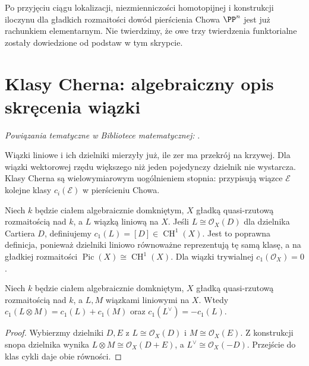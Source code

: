 \begin{uwaga}
Po przyjęciu ciągu lokalizacji, niezmienniczości
homotopijnej i konstrukcji iloczynu dla gładkich
rozmaitości dowód pierścienia Chowa $\PP^n$ jest
już rachunkiem elementarnym. Nie twierdzimy, że
owe trzy twierdzenia funktorialne zostały dowiedzione
od podstaw w tym skrypcie.
\end{uwaga}

\section{Klasy Cherna: algebraiczny opis skręcenia wiązki}
\label{sec:ga7-chern}

\noindent\emph{Powiązania tematyczne w Bibliotece matematycznej:} .


Wiązki liniowe i ich dzielniki mierzyły już, ile zer
ma przekrój na krzywej. Dla wiązki wektorowej rzędu
większego niż jeden pojedynczy dzielnik nie wystarcza.
Klasy Cherna są wielowymiarowym uogólnieniem stopnia:
przypisują wiązce $\mathcal E$ kolejne klasy
$c_i(\mathcal E)$ w pierścieniu Chowa.

\begin{definicja}
\label{def:ga7-c1}
Niech $k$ będzie ciałem algebraicznie domkniętym,
$X$ gładką quasi-rzutową rozmaitością nad $k$,
a $L$ wiązką liniową na $X$. Jeśli $L\cong\mathcal O_X(D)$
dla dzielnika Cartiera $D$, definiujemy
$c_1(L)=[D]\in\operatorname{CH}^1(X)$.
Jest to poprawna definicja, ponieważ dzielniki liniowo
równoważne reprezentują tę samą klasę, a na gładkiej
rozmaitości $\operatorname{Pic}(X)\cong\operatorname{CH}^1(X)$.
Dla wiązki trywialnej $c_1(\mathcal O_X)=0$.
\end{definicja}

\begin{stwierdzenie}
\label{st:ga7-c1-add}
Niech $k$ będzie ciałem algebraicznie domkniętym,
$X$ gładką quasi-rzutową rozmaitością nad $k$,
a $L,M$ wiązkami liniowymi na $X$. Wtedy
$c_1(L\otimes M)=c_1(L)+c_1(M)$ oraz
$c_1(L^\vee)=-c_1(L)$.
\end{stwierdzenie}
\begin{proof}
Wybierzmy dzielniki $D,E$ z $L\cong\mathcal O_X(D)$
i $M\cong\mathcal O_X(E)$. Z konstrukcji snopa dzielnika
wynika $L\otimes M\cong\mathcal O_X(D+E)$, a
$L^\vee\cong\mathcal O_X(-D)$.
Przejście do klas cykli daje obie równości.
\end{proof}

